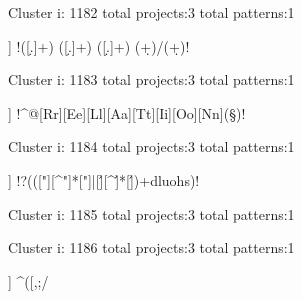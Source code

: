 Cluster i: 1182
total projects:3
total patterns:1
\begin{multicols}{1}
\begin{description}[noitemsep,topsep=0pt]
\item [[3] ] \cverb!([\d.]+) ([\d.]+) ([\d.]+) (\d+)/(\d+)!
\end{description}
\end{multicols}







Cluster i: 1183
total projects:3
total patterns:1
\begin{multicols}{1}
\begin{description}[noitemsep,topsep=0pt]
\item [[3] ] \cverb!^@[Rr][Ee][Ll][Aa][Tt][Ii][Oo][Nn]\s*(\S*)!
\end{description}
\end{multicols}







Cluster i: 1184
total projects:3
total patterns:1
\begin{multicols}{1}
\begin{description}[noitemsep,topsep=0pt]
\item [[3] ] \cverb!\s?((["][^"]*["]|[\'][^\']*[\'])\s+dluohs)!
\end{description}
\end{multicols}







Cluster i: 1185
total projects:3
total patterns:1
\begin{multicols}{1}
\end{multicols}







Cluster i: 1186
total projects:3
total patterns:1
\begin{multicols}{1}
\begin{description}[noitemsep,topsep=0pt]
\item [[3] ] \cverb@^([,;/%
\end{description}
\end{multicols}







